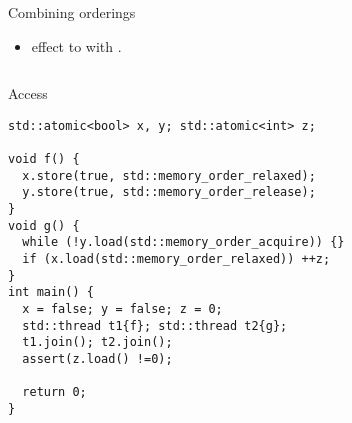 \begin{frame}[fragile]{Combining orderings}
\begin{itemize}
\item {} effect to  
      with .
\end{itemize}
\begin{columns}

\begin{column}{.5\textwidth}
\begin{block}{Access}
\begin{lstlisting}[basicstyle=\tiny]
std::atomic<bool> x, y; std::atomic<int> z;

void f() {
  x.store(true, std::memory_order_relaxed);
  y.store(true, std::memory_order_release);
}
void g() {
  while (!y.load(std::memory_order_acquire)) {}
  if (x.load(std::memory_order_relaxed)) ++z;
}
int main() {
  x = false; y = false; z = 0;
  std::thread t1{f}; std::thread t2{g};
  t1.join(); t2.join();
  assert(z.load() !=0);

  return 0;
}
\end{lstlisting}
\end{block}
\end{column}

\begin{column}{.5\textwidth}

\end{column}

\end{columns}
\end{frame}


